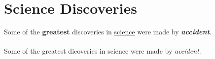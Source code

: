 \documentclass{article}
\begin{document}
	\section{Science Discoveries}Some of the \textbf{greatest}
	discoveries in \underline{science} were made by 
	\textbf{\textit{accident}}.
	
	\paragraph{}
	Some of the greatest dicoveries in science were made by \emph{accident}.
\end{document}
